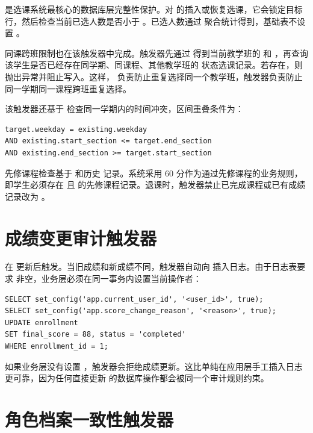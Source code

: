  是选课系统最核心的数据库层完整性保护。对  的插入或恢复选课，它会锁定目标  行，然后检查当前已选人数是否小于 。已选人数通过  聚合统计得到，基础表不设置 。

同课跨班限制也在该触发器中完成。触发器先通过  得到当前教学班的  和 ，再查询该学生是否已经存在同学期、同课程、其他教学班的  状态选课记录。若存在，则抛出异常并阻止写入。这样， 负责防止重复选择同一个教学班，触发器负责防止同一学期同一课程跨班重复选择。

该触发器还基于  检查同一学期内的时间冲突，区间重叠条件为：

\begin{lstlisting}[style=sqlstyle]
target.weekday = existing.weekday
AND existing.start_section <= target.end_section
AND existing.end_section >= target.start_section
\end{lstlisting}

先修课程检查基于  和历史  记录。系统采用 60 分作为通过先修课程的业务规则，即学生必须存在  且  的先修课程记录。退课时，触发器禁止已完成课程或已有成绩记录改为 。

\section{成绩变更审计触发器}

 在  更新后触发。当旧成绩和新成绩不同，触发器自动向  插入日志。由于日志表要求  非空，业务层必须在同一事务内设置当前操作者：

\begin{lstlisting}[style=sqlstyle]
SELECT set_config('app.current_user_id', '<user_id>', true);
SELECT set_config('app.score_change_reason', '<reason>', true);
UPDATE enrollment
SET final_score = 88, status = 'completed'
WHERE enrollment_id = 1;
\end{lstlisting}

如果业务层没有设置 ，触发器会拒绝成绩更新。这比单纯在应用层手工插入日志更可靠，因为任何直接更新  的数据库操作都会被同一个审计规则约束。

\section{角色档案一致性触发器}

